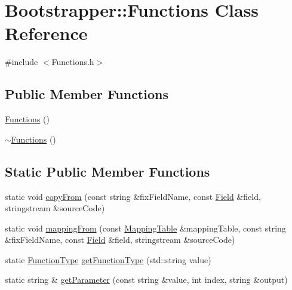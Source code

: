 \hypertarget{classBootstrapper_1_1Functions}{}\section{Bootstrapper\+:\+:Functions Class Reference}
\label{classBootstrapper_1_1Functions}


{\ttfamily \#include $<$Functions.\+h$>$}

\subsection*{Public Member Functions}
\begin{DoxyCompactItemize}
\item 
\hyperlink{classBootstrapper_1_1Functions_a328406eb87b860a0551fc655165e289a}{Functions} ()
\item 
\hyperlink{classBootstrapper_1_1Functions_a36b95e782d59ec747cc0056aced7e3c6}{$\sim$\+Functions} ()
\end{DoxyCompactItemize}
\subsection*{Static Public Member Functions}
\begin{DoxyCompactItemize}
\item 
static void \hyperlink{classBootstrapper_1_1Functions_ad0e49b87fddca35ccd6d199359355480}{copy\+From} (const string \&fix\+Field\+Name, const \hyperlink{classBootstrapper_1_1Field}{Field} \&field, stringstream \&source\+Code)
\item 
static void \hyperlink{classBootstrapper_1_1Functions_a27b7cf28d634bb3769fe7ae2cf7a7568}{mapping\+From} (const \hyperlink{classBootstrapper_1_1MappingTable}{Mapping\+Table} \&mapping\+Table, const string \&fix\+Field\+Name, const \hyperlink{classBootstrapper_1_1Field}{Field} \&field, stringstream \&source\+Code)
\item 
static \hyperlink{Functions_8h_a42a11575cc237e37732d560240e04371}{Function\+Type} \hyperlink{classBootstrapper_1_1Functions_a6c6b4f7e952437243515fa7d087eff46}{get\+Function\+Type} (std\+::string value)
\item 
static string \& \hyperlink{classBootstrapper_1_1Functions_aaeb97edc7fdc8770ad048a09952d8bdc}{get\+Parameter} (const string \&value, int index, string \&output)
\end{DoxyCompactItemize}
